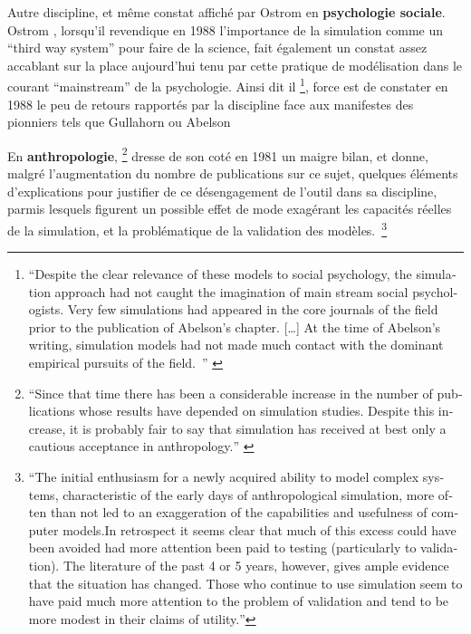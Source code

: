 Autre discipline, et même constat affiché par Ostrom en \textbf{psychologie sociale}. Ostrom \autocite{Ostrom1988}, lorsqu'il revendique en 1988 l'importance de la simulation comme un \foreignquote{english}{third way system} pour faire de la science,  fait également un constat assez accablant sur la place aujourd'hui tenu par cette pratique de modélisation dans le courant \foreignquote{english}{mainstream} de la psychologie. Ainsi dit il \footnote{ \foreignquote{english}{Despite the clear relevance of these models to  social psychology, the simulation approach had not caught the imagination of main stream social psychologists. Very few simulations had appeared in the core journals of the field prior to the publication of Abelson's chapter. […] At the time of Abelson's writing, simulation models had not made much contact with the dominant empirical pursuits of the field. } \autocite[382]{Ostrom1988}}, force est de constater en 1988 le peu de retours rapportés par la discipline face aux manifestes des pionniers tels que Gullahorn \autocite{Gullahorn1965} ou Abelson \autocite{Abelson1968} 

En \textbf{anthropologie}, \autocite{Dyke1981} \footnote{ \foreignquote{english}{Since that time there has been a considerable increase in the number of publications whose results have depended on simulation studies. Despite this increase, it is probably fair to say that simulation has received at best only a cautious acceptance in anthropology.} \autocite{Dyke1981} } dresse de son coté en 1981 un maigre bilan, et donne, malgré l'augmentation du nombre de publications sur ce sujet, quelques éléments d'explications pour justifier de ce désengagement de l'outil dans sa discipline, parmis lesquels figurent un possible effet de mode exagérant les capacités réelles de la simulation, et la problématique de la validation des modèles. \footnote{\foreignquote{english}{The initial enthusiasm for a newly acquired ability to model complex systems, characteristic of the early days of anthropological simulation, more often than not led to an exaggeration of the capabilities and usefulness of computer models.In retrospect it seems clear that much of this excess could have been avoided had more attention been paid to testing (particularly to validation). The literature of the past 4 or 5 years, however, gives ample evidence that the situation has changed. Those who continue to use simulation seem to have paid much more attention to the problem of validation and tend to be more modest in their claims of utility.}}


